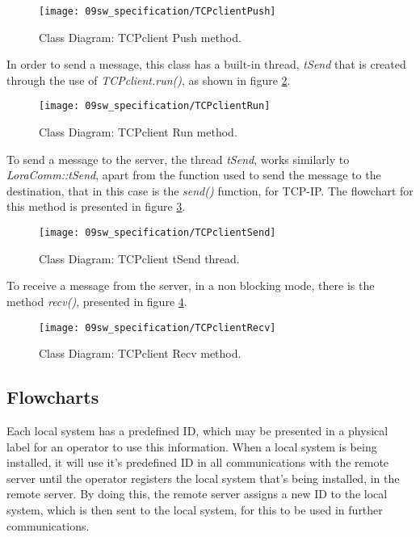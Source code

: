 \begin{figure}[H]
	\centering
	\texttt{[image: 09sw\_specification/TCPclientPush]}
	\caption{Class Diagram: TCPclient Push method.}
	\label{fig:TCPclientPush}
\end{figure}

In order to send a message, this class has a built-in thread, \textit{tSend} that is created through the use of \textit{TCPclient.run()}, as shown in figure \ref{fig:TCPclientRun}.

\begin{figure}[H]
	\centering
	\texttt{[image: 09sw\_specification/TCPclientRun]}
	\caption{Class Diagram: TCPclient Run method.}
	\label{fig:TCPclientRun}
\end{figure}

To send a message to the server, the thread \textit{tSend}, works similarly to \textit{LoraComm::tSend}, apart from the function used to send the message to the destination, that in this case is the \textit{send()} function, for TCP-IP. The flowchart for this method is presented in figure \ref{fig:TCPclientSend}.

\begin{figure}[H]
	\centering
	\texttt{[image: 09sw\_specification/TCPclientSend]}
	\caption{Class Diagram: TCPclient tSend thread.}
	\label{fig:TCPclientSend}
\end{figure}

To receive a message from the server, in a non blocking mode, there is the method \textit{recv()}, presented in figure \ref{fig:TCPclientRecv}.

\begin{figure}[H]
	\centering
	\texttt{[image: 09sw\_specification/TCPclientRecv]}
	\caption{Class Diagram: TCPclient Recv method.}
	\label{fig:TCPclientRecv}
\end{figure}

\subsection{Flowcharts}
Each local system has a predefined ID, which may be presented in a physical label for an operator to use this information. When a local system is being installed, it will use it's predefined ID in all communications with the remote server until the operator registers the local system that's being installed, in the remote server. By doing this, the remote server assigns a new ID to the local system, which is then sent to the local system, for this to be used in further communications.

